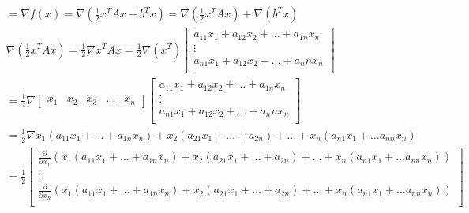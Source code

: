 \documentclass{article}
\begin{document}
\begin{gather*}
    = \nabla f(x) = \nabla (\frac{1}{2} x^TAx + b^Tx) = \nabla(\frac{1}{2} x^TAx) + \nabla(b^Tx) \\
    \nabla (\frac{1}{2} x^TAx) = \frac{1}{2} \nabla x^TAx = \frac{1}{2} \nabla (x^T)\begin{bmatrix}
        a_{11}x_{1} + a_{12}x_{2} + \hdots + a_{1n}x_{n} \\
        \vdots \\
        a_{n1}x_{1} + a_{12}x_{2} + \hdots + {a_nn}x_n \\
    \end{bmatrix} \\
    = \frac{1}{2} \nabla \begin{bmatrix}
        x_1 & x_2 & x_3 & \hdots & x_n
    \end{bmatrix} 
    \begin{bmatrix}
        a_{11}x_{1} + a_{12}x_{2} + \hdots + a_{1n}x_{n} \\
        \vdots \\
        a_{n1}x_{1} + a_{12}x_{2} + \hdots + {a_nn}x_n \\
    \end{bmatrix} \\
    = \frac{1}{2} \nabla x_1 (a_{11}x_1 + \hdots + a_{1n}{x_n}) + x_2 (a_{21}x_1 + \hdots + a_{2n}) + \hdots + x_n(a_{n1}x_1 + \hdots a_{nn}x_n) \\
    = \frac{1}{2} \begin{bmatrix}
        \frac{\partial}{\partial x_1}( x_1 (a_{11}x_1 + \hdots + a_{1n}{x_n}) + x_2 (a_{21}x_1 + \hdots + a_{2n}) + \hdots +
         x_n(a_{n1}x_1 + \hdots a_{nn}x_n)) \\
        \vdots \\
        \frac{\partial}{\partial x_n} (x_1 (a_{11}x_1 + \hdots + a_{1n}{x_n}) + x_2 (a_{21}x_1 + \hdots + a_{2n}) + \hdots +
        x_n(a_{n1}x_1 + \hdots a_{nn}x_n)) \\
    \end{bmatrix} \\
\end{gather*}
\end{document}
